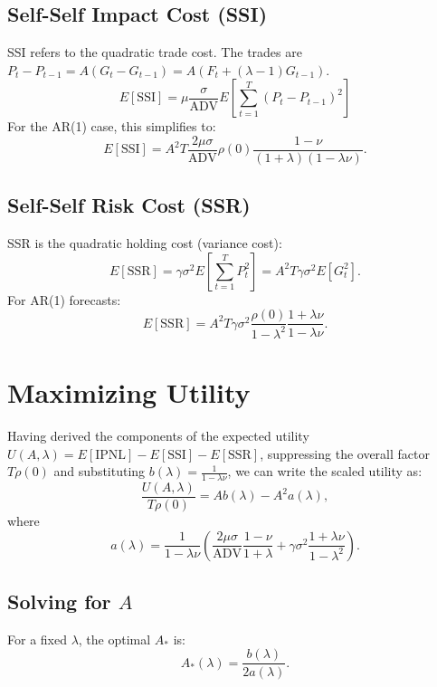 \documentclass[11pt]{article}
\begin{document}
\subsection{Self-Self Impact Cost (SSI)}
SSI refers to the quadratic trade cost. The trades are $P_t - P_{t-1} = A(G_t - G_{t-1}) = A(F_t + (\lambda-1)G_{t-1})$.
\begin{equation}
    E[\text{SSI}] = \mu \frac{\sigma}{\text{ADV}} E\left[ \sum_{t=1}^T (P_t - P_{t-1})^2 \right]
\end{equation}
For the AR(1) case, this simplifies to:
\begin{equation}
    E[\text{SSI}] = A^2 T \frac{2 \mu \sigma}{\text{ADV}} \rho(0) \frac{1-\nu}{(1+\lambda)(1-\lambda\nu)}.
\end{equation}

\subsection{Self-Self Risk Cost (SSR)}
SSR is the quadratic holding cost (variance cost):
\begin{equation}
    E[\text{SSR}] = \gamma \sigma^2 E\left[ \sum_{t=1}^T P_t^2 \right] = A^2 T \gamma \sigma^2 E[G_t^2].
\end{equation}
For AR(1) forecasts:
\begin{equation}
    E[\text{SSR}] = A^2 T \gamma \sigma^2 \frac{\rho(0)}{1-\lambda^2} \frac{1+\lambda \nu}{1 - \lambda \nu}.
\end{equation}

\section{Maximizing Utility}

Having derived the components of the expected utility $U(A, \lambda) = E[\text{IPNL}] - E[\text{SSI}] - E[\text{SSR}]$, suppressing the overall factor $T \rho(0)$ and substituting $b(\lambda) = \frac{1}{1-\lambda\nu}$, we can write the scaled utility as:
\begin{equation}
    \frac{U(A, \lambda)}{T \rho(0)} = A b(\lambda) - A^2 a(\lambda),
\end{equation}
where
\begin{equation}
    a(\lambda) = \frac{1}{1 - \lambda \nu} \left( \frac{2 \mu \sigma}{\text{ADV}} \frac{1-\nu}{1+\lambda} + \gamma \sigma^2 \frac{1+\lambda\nu}{1-\lambda^2} \right).
\end{equation}

\subsection{Solving for $A$}
For a fixed $\lambda$, the optimal $A_*$ is:
\begin{equation}
    A_*(\lambda) = \frac{b(\lambda)}{2 a(\lambda)}.
\end{equation}
\end{document}
